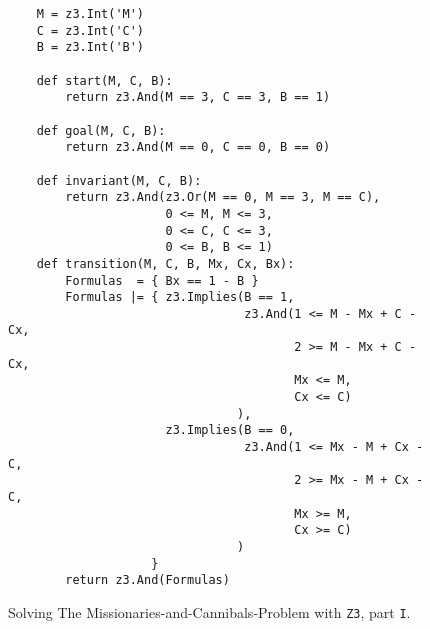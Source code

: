 \begin{figure}[!ht]
\centering
\begin{verbatim}
    M = z3.Int('M')
    C = z3.Int('C')
    B = z3.Int('B')
    
    def start(M, C, B):
        return z3.And(M == 3, C == 3, B == 1)
    
    def goal(M, C, B):
        return z3.And(M == 0, C == 0, B == 0)
    
    def invariant(M, C, B):
        return z3.And(z3.Or(M == 0, M == 3, M == C),
                      0 <= M, M <= 3,
                      0 <= C, C <= 3,
                      0 <= B, B <= 1)
    def transition(M, C, B, Mx, Cx, Bx):
        Formulas  = { Bx == 1 - B }
        Formulas |= { z3.Implies(B == 1, 
                                 z3.And(1 <= M - Mx + C - Cx, 
                                        2 >= M - Mx + C - Cx,
                                        Mx <= M, 
                                        Cx <= C)
                                ),
                      z3.Implies(B == 0, 
                                 z3.And(1 <= Mx - M + Cx - C,
                                        2 >= Mx - M + Cx - C,
                                        Mx >= M, 
                                        Cx >= C)
                                )
                    }
        return z3.And(Formulas)
\end{verbatim}
\vspace*{-0.3cm}
\caption{Solving The Missionaries-and-Cannibals-Problem with \texttt{Z3}, part \texttt{I}.}
\label{fig:Missionaries-Z3.ipynb-1}
\end{figure}


